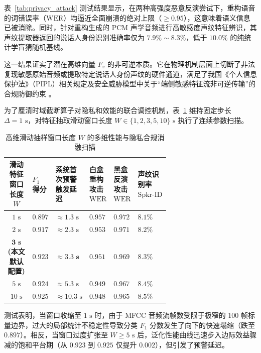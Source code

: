 \documentclass[11pt, a4paper]{article}
\begin{document}
表~\ref{tab:privacy_attack} 测试结果显示，在两种高强度恶意反演尝试下，重构语音的词错误率（$\mathrm{WER}$）均逼近全面崩溃的绝对上限（$\ge 0.95$），这意味着语义信息已被消除。同时，针对重构生成的 PCM 声学音频进行高敏感度声纹特征辨识，其声纹提取器返回的说话人身份识别准确率仅为 $7.9\% \sim 8.3\%$，低于 $10.0\%$ 的纯统计学盲猜随机基线。

这一结果证实了潜在高维向量 $F_v$ 的非可逆本质。它在物理机制层面上切断了非法复现敏感原始音频或提取特定说话人身份声纹的硬件通道，满足了我国《个人信息保护法》（PIPL）相关规定及安全威胁模型中关于“端侧敏感特征流非可逆传输”的合规防御约束 。

为了厘清时域截断算子对隐私和效能的联合调控机制，表~\ref{tab:window_ablation} 维持固定步长 $\Delta = 1\text{ s}$，对特征抽取滑动窗口长度 $W \in \{1, 2, 3, 5, 10\}\text{ s}$ 执行了连续参数扫描。

\begin{table}[htbp]
\centering
\caption{高维滑动抽样窗口长度 $W$ 的多维性能与隐私合规消融扫描}
\label{tab:window_ablation}
\small
\renewcommand{\arraystretch}{1.15}
\begin{tabular}{c>{\centering\arraybackslash}p{0.12\linewidth}>{\centering\arraybackslash}p{0.12\linewidth}>{\centering\arraybackslash}p{0.14\linewidth}>{\centering\arraybackslash}p{0.14\linewidth}>{\centering\arraybackslash}p{0.12\linewidth}}
\toprule
\textbf{滑动特征窗口长度 $W$} & \textbf{$F_1$ 得分} & \textbf{系统首次预警触发延迟} & \textbf{白盒重构攻击 $\mathrm{WER}$} & \textbf{黑盒反演攻击 $\mathrm{WER}$} & \textbf{声纹识别率 $\mathrm{Spkr\text{-}ID}$} \\
\midrule
$1\text{ s}$ & $0.897$ & $\approx 1.3\text{ s}$ & $0.957$ & $0.972$ & $8.1\%$ \\
$2\text{ s}$ & $0.917$ & $\approx 2.3\text{ s}$ & $0.953$ & $0.971$ & $8.2\%$ \\
$\mathbf{3\text{ s}}$ \textbf{(本文默认配置)} & $\mathbf{0.923}$ & $\mathbf{\approx 3.3\text{ s}}$ & $\mathbf{0.951}$ & $\mathbf{0.969}$ & $\mathbf{8.3\%}$ \\
$5\text{ s}$ & $0.924$ & $\approx 5.3\text{ s}$ & $0.949$ & $0.967$ & $8.4\%$ \\
$10\text{ s}$ & $0.925$ & $\approx 10.3\text{ s}$ & $0.948$ & $0.965$ & $8.5\%$ \\
\bottomrule
\end{tabular}
\end{table}

测试表明，当窗口收缩至 $1\text{ s}$ 时，由于 MFCC 音频流帧数受限于极窄的 $100$ 帧标量边界，过大的局部统计不稳定性导致分类 $F_1$ 分数发生了向下的快速塌缩（跌至 $0.897$）。相反，当窗口过度扩张至 $W \ge 5\text{ s}$ 后，泛化性能曲线迅速步入边际效益骤减的饱和平台期（从 $0.923$ 到 $0.925$ 仅提升 $0.002$），但引发了预警延迟。
\end{document}

